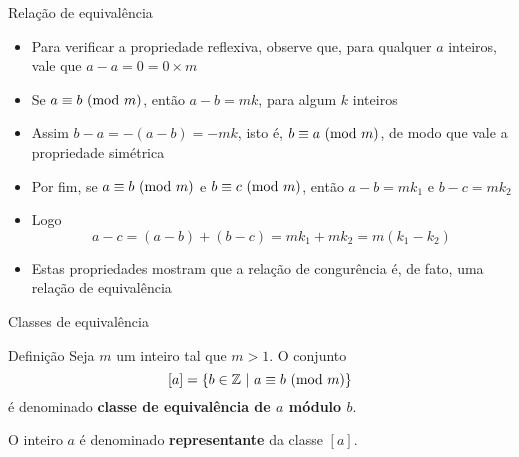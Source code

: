 \begin{frame}[fragile]{Relação de equivalência}

    \begin{itemize}
        \item Para verificar a propriedade reflexiva, observe que, para qualquer $a$ inteiros, vale
            que $a - a = 0 = 0\times m$

        \item Se $a\equiv b\ (\mbox{mod}\ m)$, então $a - b = mk$, para algum $k$ inteiros

        \item Assim $b - a = -(a - b) = -mk$, isto é, $b\equiv a\ (\mbox{mod}\ m)$, de modo que vale a 
            propriedade simétrica

        \item Por fim, se $a\equiv b\ (\mbox{mod}\ m)$ e $b\equiv c\ (\mbox{mod}\ m)$, então $a - b = mk_1$ e 
            $b - c = mk_2$

        \item Logo
        $$
            a - c = (a - b) + (b - c) = mk_1 + mk_2 = m(k_1 - k_2)
        $$

        \item Estas propriedades mostram que a relação de congurência é, de fato, uma relação de 
            equivalência 
    \end{itemize}

\end{frame}

\begin{frame}[fragile]{Classes de equivalência}

    \begin{block}{Definição}
        Seja $m$ um inteiro tal que $m > 1$. O conjunto
        $$
            [a] = \{ b\in\mathbb{Z}\ |\ a\equiv \Mod{b}{m}\}
        $$
        é denominado \textbf{classe de equivalência de $a$ módulo $b$}.

        O inteiro $a$ é denominado \textbf{representante} da classe $[a]$.
    \end{block}

\end{frame}

